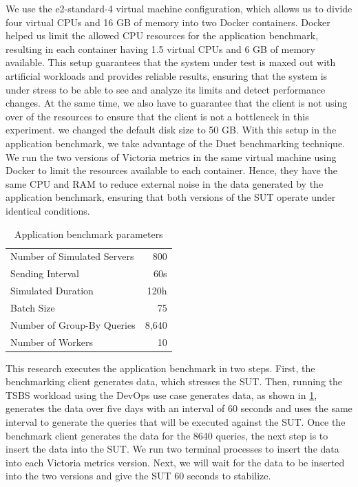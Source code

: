 We use the e2-standard-4 virtual machine configuration, which allows us to divide four virtual \ac{CPU}s and 16 GB of memory into two Docker containers. Docker helped us limit the allowed CPU resources for the application benchmark, resulting in each container having 1.5 virtual \ac{CPU}s and 6 GB of memory available. This setup guarantees that the system under test is maxed out with artificial workloads and provides reliable results, ensuring that the system is under stress to be able to see and analyze its limits and detect performance changes. At the same time, we also have to guarantee that the client is not using over  of the resources to ensure that the client is not a bottleneck in this experiment. we changed the default disk size to 50 GB. With this setup in the application benchmark, we take advantage of the Duet benchmarking technique. We run the two versions of Victoria metrics in the same virtual machine using Docker to limit the resources available to each container. Hence, they have the same \ac{CPU} and \ac{RAM} to reduce external noise in the data generated by the application benchmark, ensuring that both versions of the \ac{SUT} operate under identical conditions. \\
\begin{table}[ht]
    \centering
    \begin{tabular}{l r}
        \toprule
        \midrule
        Number of Simulated Servers & 800 \\
        Sending Interval & 60s \\
        Simulated Duration & 120h \\
        Batch Size & 75 \\
        Number of Group-By Queries & 8,640 \\
        Number of Workers & 10 \\
        \bottomrule
    \end{tabular}
    \caption{Application benchmark parameters}
    \label{tab:applicationBenchmarkParameters}
\end{table}
This research executes the application benchmark in two steps. First, the benchmarking client generates data, which stresses the \ac{SUT}. Then, running the \ac{TSBS} workload using the DevOps use case generates data, as shown in \cref{tab:applicationBenchmarkParameters}, generates the data over five days with an interval of 60 seconds and uses the same interval to generate the queries that will be executed against the \ac{SUT}. Once the benchmark client generates the data for the 8640 queries, the next step is to insert the data into the \ac{SUT}. We run two terminal processes to insert the data into each Victoria metrics version. Next, we will wait for the data to be inserted into the two versions and give the \ac{SUT} 60 seconds to stabilize. \\

